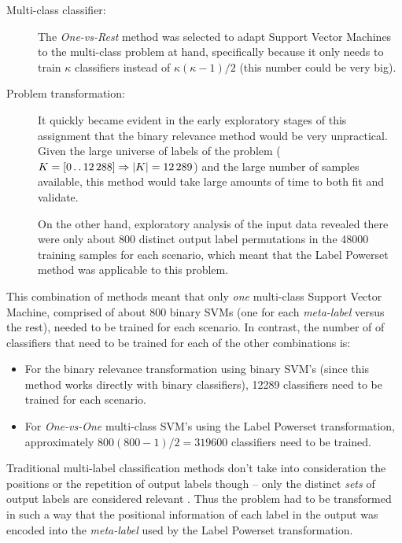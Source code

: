 \documentclass{kthreport}
\theoremstyle{definition}
\newcommand{\twodots}{\mathinner {\ldotp \ldotp}}
\begin{document}
\begin{description}
    \item[Multi-class classifier:] The \emph{One-vs-Rest} method was selected to adapt Support Vector Machines to the multi-class problem at hand, specifically because it only needs to train $\kappa$ classifiers instead of $\kappa(\kappa-1)/2$ (this number could be very big).
    \item[Problem transformation:] It quickly became evident in the early exploratory stages of this assignment that the binary relevance method would be very unpractical. Given the large universe of labels of the problem ($ K = [0 \twodots \num{12288}] \Rightarrow |K| = \num{12289}$) and the large number of samples available, this method would take large amounts of time to both fit and validate.
    
    On the other hand, exploratory analysis of the input data revealed there were only about \num{800} distinct output label permutations in the \num{48000} training samples for each scenario, which meant that the Label Powerset method was applicable to this problem. 
\end{description}

This combination of methods meant that only \emph{one} multi-class Support Vector Machine, comprised of about \num{800} binary SVMs (one for each \emph{meta-label} versus the rest), needed to be trained for each scenario. In contrast, the number of of classifiers that need to be trained for each of the other combinations is:

\begin{itemize}
    \item For the binary relevance transformation using binary SVM's (since this method works directly with binary classifiers), \num{12289} classifiers need to be trained for each scenario.
    \item For \emph{One-vs-One} multi-class SVM's using the Label Powerset transformation, approximately $800(800-1)/2 = \num{319600}$ classifiers need to be trained. 
\end{itemize}

Traditional multi-label classification methods don't take into consideration the positions or the repetition of output labels though -- only the distinct \emph{sets} of output labels are considered relevant \autocite{tsoumakas2006multi}. Thus the problem had to be transformed in such a way that the positional information of each label in the output was encoded into the \emph{meta-label} used by the Label Powerset transformation.
\end{document}
